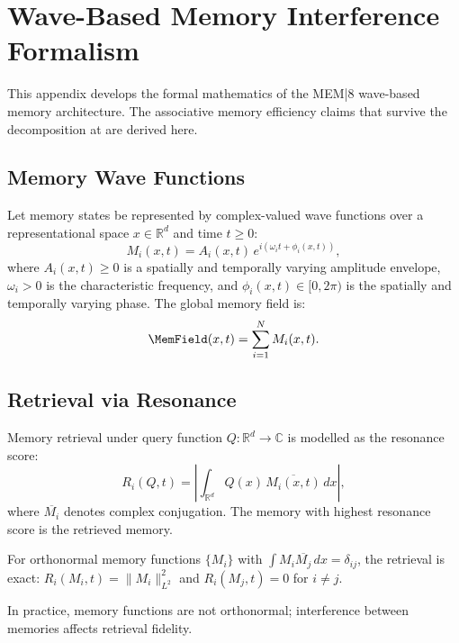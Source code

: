 
\chapter{Wave-Based Memory Interference Formalism}
\label{app:memory}

\noindent
This appendix develops the formal mathematics of the
MEM|8 wave-based memory architecture. The associative
memory efficiency claims that survive the decomposition
at \LevelI{} are derived here.

\section{Memory Wave Functions}
\label{app-d:wave-functions}

Let memory states be represented by complex-valued
wave functions over a representational space $x \in \mathbb{R}^d$
and time $t \ge 0$:
\[
  M_i(x,t) = A_i(x,t)\,e^{i(\omega_i t + \phi_i(x,t))},
\]
where $A_i(x,t) \ge 0$ is a spatially and temporally
varying amplitude envelope, $\omega_i > 0$ is the
characteristic frequency, and $\phi_i(x,t) \in [0, 2\pi)$
is the spatially and temporally varying phase. The global
memory field is:
\[
  \MemField(x,t) = \sum_{i=1}^{N} M_i(x,t).
\]

\section{Retrieval via Resonance}
\label{app-d:retrieval}

Memory retrieval under query function $Q : \mathbb{R}^d \to \mathbb{C}$
is modelled as the resonance score:
\[
  R_i(Q,t) = \left|\int_{\mathbb{R}^d}
  Q(x)\,\overline{M_i(x,t)}\,dx\right|,
\]
where $\overline{M_i}$ denotes complex conjugation. The
memory with highest resonance score is the retrieved
memory.

\begin{proposition}
For orthonormal memory functions $\{M_i\}$ with
$\int M_i \overline{M_j}\,dx = \delta_{ij}$, the retrieval
is exact: $R_i(M_i, t) = \|M_i\|_{L^2}^2$ and
$R_i(M_j, t) = 0$ for $i \neq j$.
\end{proposition}

In practice, memory functions are not orthonormal;
interference between memories affects retrieval fidelity.

